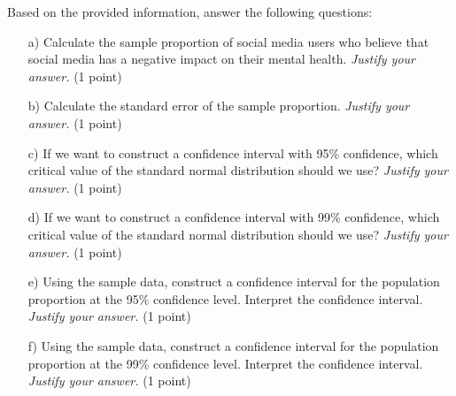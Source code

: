 \documentclass{article}
\begin{document}
Based on the provided information, answer the following questions:

\begin{enumerate}
\item[a)] Calculate the sample proportion of social media users who believe that social media has a negative impact on their mental health. \emph{Justify your answer.} (1 point)
\begin{center}
\end{center}

\item[b)] Calculate the standard error of the sample proportion. \emph{Justify your answer.} (1 point)
\begin{center}
\end{center}

\item[c)] If we want to construct a confidence interval with 95\% confidence, which critical value of the standard normal distribution should we use? \emph{Justify your answer.} (1 point)
    \begin{center}
    \end{center}

\item[d)] If we want to construct a confidence interval with 99\% confidence, which critical value of the standard normal distribution should we use? \emph{Justify your answer.} (1 point)
\begin{center}
\end{center}

\item[e)] Using the sample data, construct a confidence interval for the population proportion at the 95\% confidence level. Interpret the confidence interval. \emph{Justify your answer.} (1 point)
\begin{center}
\end{center}

\item[f)] Using the sample data, construct a confidence interval for the population proportion at the 99\% confidence level. Interpret the confidence interval. \emph{Justify your answer.} (1 point)
\begin{center}
\end{center}

\end{enumerate}
\end{document}
